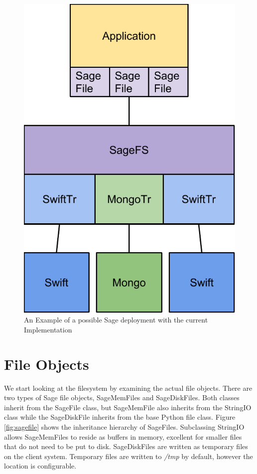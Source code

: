 \begin{figure}[h]
\centering
\includegraphics[scale=0.7]{figures/implementation}
\caption[Example Sage Deployment]{An Example of a possible Sage deployment with the current Implementation}
\label{fig:implementation}
\end{figure}


\section{File Objects}

We start looking at the filesystem by examining the actual file objects. There are two types of Sage file objects, SageMemFiles and SageDiskFiles.  Both classes inherit from the SageFile class, but SageMemFile also inherits from the StringIO class while the SageDiskFile inherits from the base Python file class. Figure \ref{fig:sagefile} shows the inheritance hierarchy of SageFiles. Subclassing StringIO allows SageMemFiles to reside as buffers in memory, excellent for smaller files that do not need to be put to disk. SageDiskFiles are written as temporary files on the client system. Temporary files are written to \textit{/tmp} by default, however the location is configurable.

